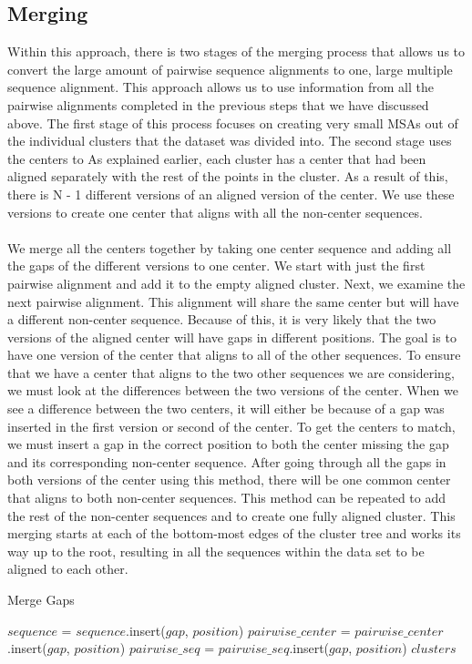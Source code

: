 \subsection{Merging}
Within this approach, there is two stages of the merging process that allows us to convert the large amount of pairwise sequence alignments to one, large multiple sequence alignment. This approach allows us to use information from all the pairwise alignments completed in the previous steps that we have discussed above. The first stage of this process focuses on creating very small MSAs out of the individual clusters that the dataset was divided into. The second stage uses the centers to As explained earlier, each cluster has a center that had been aligned separately with the rest of the points in the cluster. As a result of this, there is N - 1 different versions of an aligned version of the center. We use these versions to create one center that aligns with all the non-center sequences. \\
\\We merge all the centers together by taking one center sequence and adding all the gaps of the different versions to one center. We start with just the first pairwise alignment and add it to the empty aligned cluster. Next, we examine the next pairwise alignment. This alignment will share the same center but will have a different non-center sequence. Because of this, it is very likely that the two versions of the aligned center will have gaps in different positions. The goal is to have one version of the center that aligns to all of the other sequences. To ensure that we have a center that aligns to the two other sequences we are considering, we must look at the differences between the two versions of the center. When we see a difference between the two centers, it will either be because of a gap was inserted in the first version or second of the center. To get the centers to match, we must insert a gap in the correct position to both the center missing the gap and its corresponding non-center sequence. After going through all the gaps in both versions of the center using this method, there will be one common center that aligns to both non-center sequences. This method can be repeated to add the rest of the non-center sequences and to create one fully aligned cluster. This merging starts at each of the bottom-most edges of the cluster tree and works its way up to the root, resulting in all the sequences within the data set to be aligned to each other.
\vspace{0.5cm} 
\begin{algorithm}[H]
\caption{Merge Gaps}
\begin{algorithmic}
            \STATE $sequence$ = $sequence$.insert($gap$, $position$)
        \ENDFOR
        \STATE $pairwise\_center$ = $pairwise\_center$.insert($gap$, $position$)
        \STATE $pairwise\_seq$ = $pairwise\_seq$.insert($gap$, $position$)
    \ENDIF
\ENDFOR
\STATE \RETURN $clusters$
\end{algorithmic}
\end{algorithm}

